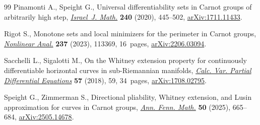 \documentclass[pdftex]{sigma}
\numberwithin{equation}{section}
\theoremstyle{definition}
\begin{document}
\begin{thebibliography}{99}
Pinamonti A., Speight G., Universal differentiability sets in {C}arnot groups
 of arbitrarily high step,
 \href{https://doi.org/10.1007/s11856-020-2069-x}{\textit{Israel~J. Math.}}
 \textbf{240} (2020), 445--502,
 \href{http://arxiv.org/abs/1711.11433}{arXiv:1711.11433}.

Rigot S., Monotone sets and local minimizers for the perimeter in {C}arnot
 groups, \href{https://doi.org/10.1016/j.na.2023.113369}{\textit{Nonlinear
 Anal.}} \textbf{237} (2023), 113369, 16~pages,
 \href{http://arxiv.org/abs/2206.03094}{arXiv:2206.03094}.

Sacchelli L., Sigalotti M., On the {W}hitney extension property for
 continuously differentiable horizontal curves in sub-{R}iemannian manifolds,
 \href{https://doi.org/10.1007/s00526-018-1336-8}{\textit{Calc. Var. Partial
 Differential Equations}} \textbf{57} (2018), 59, 34~pages,
 \href{http://arxiv.org/abs/1708.02795}{arXiv:1708.02795}.

Speight G., Zimmerman S., Directional pliability, {W}hitney extension, and
 {L}usin approximation for curves in {C}arnot groups,
 \href{https://doi.org/10.54330/afm.176524}{\textit{Ann. Fenn. Math.}}
 \textbf{50} (2025), 665--684,
 \href{http://arxiv.org/abs/2505.14678}{arXiv:2505.14678}.

\end{thebibliography}\LastPageEnding
\end{document}
